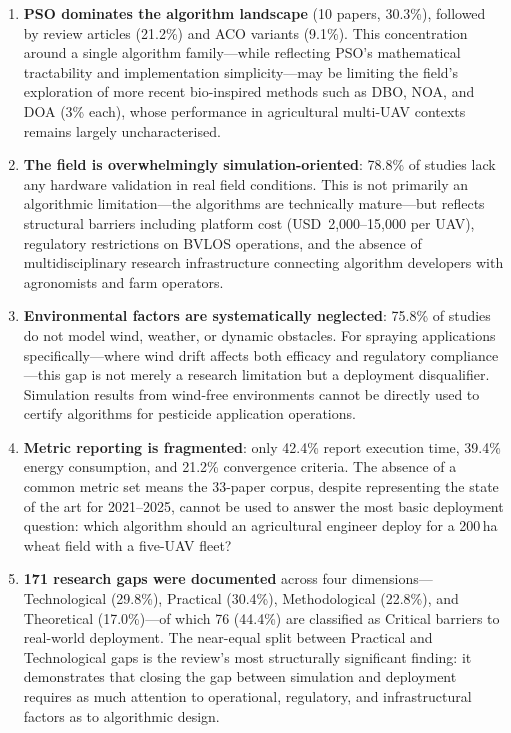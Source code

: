 \documentclass[review,3p,times]{elsarticle}
\begin{document}
\begin{enumerate}
  \item \textbf{PSO dominates the algorithm landscape} (10 papers, 30.3\%), followed by review articles (21.2\%) and ACO variants (9.1\%). This concentration around a single algorithm family---while reflecting PSO's mathematical tractability and implementation simplicity---may be limiting the field's exploration of more recent bio-inspired methods such as DBO, NOA, and DOA (3\% each), whose performance in agricultural multi-UAV contexts remains largely uncharacterised.

  \item \textbf{The field is overwhelmingly simulation-oriented}: 78.8\% of studies lack any hardware validation in real field conditions. This is not primarily an algorithmic limitation---the algorithms are technically mature---but reflects structural barriers including platform cost (USD~2,000--15,000 per UAV), regulatory restrictions on BVLOS operations, and the absence of multidisciplinary research infrastructure connecting algorithm developers with agronomists and farm operators.

  \item \textbf{Environmental factors are systematically neglected}: 75.8\% of studies do not model wind, weather, or dynamic obstacles. For spraying applications specifically---where wind drift affects both efficacy and regulatory compliance---this gap is not merely a research limitation but a deployment disqualifier. Simulation results from wind-free environments cannot be directly used to certify algorithms for pesticide application operations.

  \item \textbf{Metric reporting is fragmented}: only 42.4\% report execution time, 39.4\% energy consumption, and 21.2\% convergence criteria. The absence of a common metric set means the 33-paper corpus, despite representing the state of the art for 2021--2025, cannot be used to answer the most basic deployment question: which algorithm should an agricultural engineer deploy for a 200\,ha wheat field with a five-UAV fleet?

  \item \textbf{171 research gaps were documented} across four dimensions---Technological (29.8\%), Practical (30.4\%), Methodological (22.8\%), and Theoretical (17.0\%)---of which 76 (44.4\%) are classified as Critical barriers to real-world deployment. The near-equal split between Practical and Technological gaps is the review's most structurally significant finding: it demonstrates that closing the gap between simulation and deployment requires as much attention to operational, regulatory, and infrastructural factors as to algorithmic design.
\end{enumerate}
\end{document}
